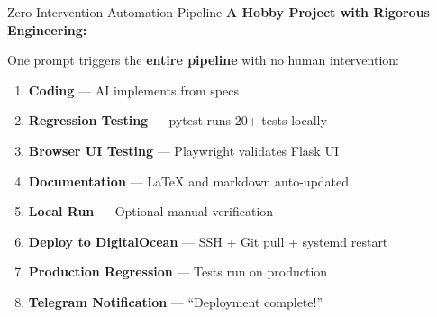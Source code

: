 \documentclass[aspectratio=169,11pt]{beamer}
\begin{document}
\begin{frame}{Zero-Intervention Automation Pipeline}
\textbf{A Hobby Project with Rigorous Engineering:}

One prompt triggers the \textbf{entire pipeline} with no human intervention:

\begin{enumerate}
    \item \textcolor{blue!70}{\textbf{Coding}} --- AI implements from specs
    \item \textcolor{orange!70}{\textbf{Regression Testing}} --- pytest runs 20+ tests locally
    \item \textcolor{purple!70}{\textbf{Browser UI Testing}} --- Playwright validates Flask UI
    \item \textcolor{green!70}{\textbf{Documentation}} --- LaTeX and markdown auto-updated
    \item \textcolor{gray!70}{\textbf{Local Run}} --- Optional manual verification
    \item \textcolor{cyan!70}{\textbf{Deploy to DigitalOcean}} --- SSH + Git pull + systemd restart
    \item \textcolor{orange!70}{\textbf{Production Regression}} --- Tests run on production
    \item \textcolor{red!70}{\textbf{Telegram Notification}} --- ``Deployment complete!''
\end{enumerate}

\vspace{0.3cm}
\begin{center}
\end{center}
\end{frame}
\end{document}
